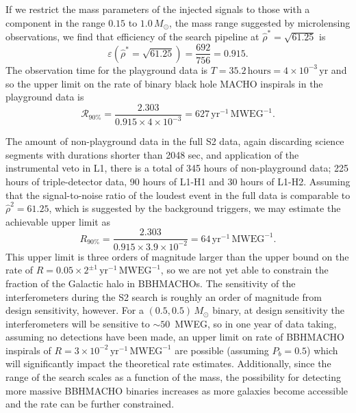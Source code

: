 If we restrict the mass parameters of the injected signals to those with a
component in the range $0.15$ to $1.0\,M_\odot$, the mass range suggested by
microlensing observations, we find that efficiency of the search pipeline at
$\hat{\rho}^\ast = \sqrt{61.25}$ is 
\begin{equation}
\varepsilon\left( \hat{\rho}^\ast = \sqrt{61.25} \right) = \frac{ 692 } { 756
} = 0.915.
\end{equation}
The observation time for the playground data is $T = 35.2\,\mathrm{hours} = 4
\times 10^{-3}\,\mathrm{yr}$ and so the upper limit on the rate of binary
black hole MACHO inspirals in the playground data is
\begin{equation}
\mathcal{R}_{90\%} = \frac{2.303}{0.915 \times 4 \times 10^{-3}} = 
627\,\mathrm{yr}^{-1}\,\mathrm{MWEG}^{-1}.
\end{equation}

The amount of non-playground data in the full S2 data, again discarding
science segments with durations shorter than 2048 sec,  and application of the
instrumental veto in L1, there is a total of 345 hours of non-playground data;
225 hours of triple-detector data, 90 hours of L1-H1 and 30 hours of L1-H2.
Assuming that the signal-to-noise ratio of the loudest event in the full data
is comparable to $\hat{\rho}^2 = 61.25$, which is suggested by the background
triggers, we may estimate the achievable upper limit as
\begin{equation}
R_{90\%} = \frac{2.303}{0.915 \times 3.9 \times 10^{-2}} = 
64\,\mathrm{yr}^{-1}\,\mathrm{MWEG}^{-1}.
\end{equation}
This upper limit is three orders of magnitude larger than the upper bound on
the rate of $R = 0.05\times2^{\pm 1}\,\mathrm{yr}^{-1}\,\mathrm{MWEG}^{-1}$,
so we are not yet able to constrain the fraction of the Galactic halo in
BBHMACHOs. The sensitivity of the interferometers during the S2 search is
roughly an order of magnitude from design sensitivity, however. For a
$(0.5,0.5)\,M_\odot$ binary, at design sensitivity the interferometers will be
sensitive to $\sim 50$~MWEG, so in one year of data taking, assuming no
detections have been made, an upper limit on rate of BBHMACHO inspirals of $R
= 3\times10^{-2}\,\mathrm{yr}^{-1}\,\mathrm{MWEG}^{-1}$ are possible (assuming
$P_b = 0.5$) which will significantly impact the theoretical rate estimates.
Additionally, since the range of the search scales as a function of the mass,
the possibility for detecting more massive BBHMACHO binaries increases as more
galaxies become accessible and the rate can be further constrained.

